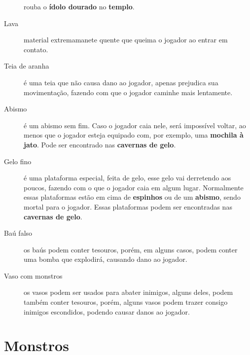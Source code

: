 \begin{description}
        rouba o \textbf{ídolo dourado} no \textbf{templo}.
    \item[Lava]
        material extremamanete quente que queima o jogador ao entrar em contato.
    \item[Teia de aranha]
        é uma teia que não causa dano ao jogador, apenas prejudica sua
        movimentação, fazendo com que o jogador caminhe mais lentamente.
    \item[Abismo]
        é um abismo sem fim. Caso o jogador caia nele, será impossível voltar,
        ao menos que o jogador esteja equipado com, por exemplo, uma
        \textbf{mochila à jato}. Pode ser encontrado nas \textbf{cavernas de gelo}.
    \item[Gelo fino]
        é uma plataforma especial, feita de gelo, esse gelo vai derretendo aos
        poucos, fazendo com o que o jogador caia em algum lugar. Normalmente
        essas plataformas estão em cima de \textbf{espinhos} ou de um
        \textbf{abismo}, sendo mortal para o jogador. Essas plataformas podem
        ser encontradas nas \textbf{cavernas de gelo}.
    \item[Baú falso]
        os baús podem conter tesouros, porém, em alguns casos, podem conter uma
        bomba que explodirá, causando dano ao jogador.
    \item[Vaso com monstros]
        os vasos podem ser usados para abater inimigos, alguns deles, podem
        também conter tesouros, porém, alguns vasos podem trazer consigo
        inimigos escondidos, podendo causar danos ao jogador.
\end{description}

\section{\label{section:spelunky-monsters}Monstros}

